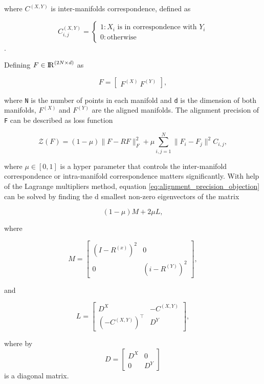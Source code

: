  where $C^{(X,Y)}$ is inter-manifolds correspondence, defined as

  \[C_{i,j}^{(X,Y)}=\begin{cases}
                    1 : X_i\text{ is in correspondence with }Y_i\\
                    0 : \text{otherwise}
                    \end{cases}\].

  Defining $F\in {\rm I\!R}^{(2N\times d)}$ as

  \[F=\begin{bmatrix}
      F^{(X)}\
      F^{(Y)}
      \end{bmatrix},\]

  where \verb|N| is the number of points in each manifold and \verb|d| is the dimension of both manifolds, $F^{(X)}$ and $F^{(Y)}$ are the aligned manifolds. The alignment precision of \verb|F| can be described as loss function

  \begin{equation}\label{eq:alignment_precision_objection}
  \mathcal{Z}(F)=(1-\mu )\|F-RF\|^2_F+\mu\sum_{i,j=1}^N\|F_i-F_j\|^2C_{i,j},
  \end{equation}

  where $\mu\in[0,1]$ is a hyper parameter that controls the inter-manifold correspondence or intra-manifold correspondence matters significantly. With help of the Lagrange multipliers method, equation \eqref{eq:alignment_precision_objection} can be solved by finding the d smallest non-zero eigenvectors of the matrix

  \begin{equation}
  (1-\mu)M+2\mu L,
  \end{equation}

  where

  \[M=\begin{bmatrix}
    (I-R^{(x)})^2 & 0\\
    0 & (i-R^{(Y)})^2
    \end{bmatrix},\]

  and

  \[L=\begin{bmatrix}
    D^X & -C^{(X,Y)}\\
    (-C^{(X,Y)})^\intercal & D^Y
    \end{bmatrix},\]

  where by \[D=\begin{bmatrix}D^X & 0\\0 & D^Y\end{bmatrix}\] is a diagonal matrix.
